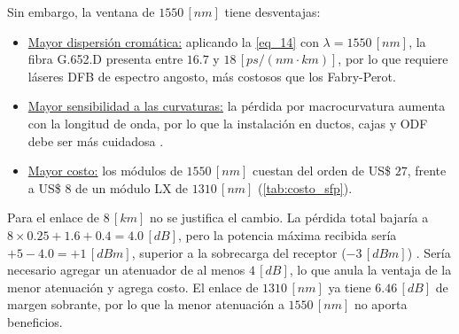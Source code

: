 Sin embargo, la ventana de $1550 \, [nm]$ tiene desventajas:
\begin{itemize}
    \item \underline{Mayor dispersión cromática:} aplicando la \autoref{eq_14} con $\lambda = 1550 \, [nm]$, la fibra G.652.D presenta entre $16.7$ y $18 \, [ps/(nm \cdot km)]$, por lo que requiere láseres DFB de espectro angosto, más costosos que los Fabry-Perot.
    \item \underline{Mayor sensibilidad a las curvaturas:} la pérdida por macrocurvatura aumenta con la longitud de onda, por lo que la instalación en ductos, cajas y ODF debe ser más cuidadosa \cite{b6}.
    \item \underline{Mayor costo:} los módulos de $1550 \, [nm]$ cuestan del orden de US\$ $27$, frente a US\$ $8$ de un módulo LX de $1310 \, [nm]$ (\autoref{tab:costo_sfp}).
\end{itemize}

Para el enlace de $8 \, [km]$ no se justifica el cambio. La pérdida total bajaría a $8 \times 0.25 + 1.6 + 0.4 = 4.0 \, [dB]$, pero la potencia máxima recibida sería $+5 - 4.0 = +1 \, [dBm]$, superior a la sobrecarga del receptor ($-3 \, [dBm]$) \cite{b11}. Sería necesario agregar un atenuador de al menos $4 \, [dB]$, lo que anula la ventaja de la menor atenuación y agrega costo. El enlace de $1310 \, [nm]$ ya tiene $6.46 \, [dB]$ de margen sobrante, por lo que la menor atenuación a $1550 \, [nm]$ no aporta beneficios.



